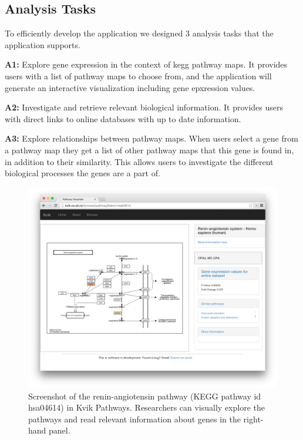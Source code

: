 \subsection{Analysis Tasks} 
To efficiently develop the application we designed 3 analysis tasks that the
application supports. 

\textbf{A1:} Explore gene expression in the context of \gls{kegg} pathway maps.
It provides users with a list of pathway maps to choose from, and the
application will generate an interactive visualization including gene epxression
values. 

\textbf{A2:} Investigate and retrieve relevant biological information. It
provides users with direct links to online databases with up to date
information. 

\textbf{A3:} Explore relationships between pathway maps. When users select a
gene from a pathway map they get a list of other pathway maps that this
gene is found in, in addition to their similarity. This allows users to
investigate the different biological processes the genes are a part of. 

\begin{figure}[htb!]
    \begin{centering}
    \includegraphics[width=\textwidth]{figures/kvikpwfig.png}
        \caption[Screenshot of the renin-angiotensin pathway in Kvik
        Pathways]{Screenshot of the renin-angiotensin pathway (KEGG pathway id
        hsa04614) in Kvik Pathways. Researchers can visually explore the
        pathways and read relevant information about genes in the right-hand
        panel.}
    \label{kvikpwfig}
    \end{centering} 
\end{figure}


